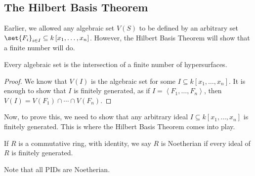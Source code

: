 \documentclass[10pt]{mypackage}
\begin{document}
\subsection{The Hilbert Basis Theorem}%
Earlier, we allowed any algebraic set $V(S)$ to be defined by an arbitrary set $\set{F_i}_{i\in I}\subseteq k\left[ x_1,\dots,x_n \right]$. However, the Hilbert Basis Theorem will show that a finite number will do.
\begin{theorem}
  Every algebraic set is the intersection of a finite number of hypersurfaces.
\end{theorem}
\begin{proof}
  We know that $V(I)$ is the algebraic set for some $I\subseteq k\left[ x_1,\dots,x_n \right]$. It is enough to show that $I$ is finitely generated, as if $I = \left\langle F_1,\dots,F_n \right\rangle$, then $V(I) = V\left( F_1 \right)\cap\cdots\cap V\left( F_n \right)$.
\end{proof}
Now, to prove this, we need to show that any arbitrary ideal $I\subseteq k\left[ x_1,\dots,x_n \right]$ is finitely generated. This is where the Hilbert Basis Theorem comes into play.
\begin{definition}
  If $R$ is a commutative ring, with identity, we say $R$ is Noetherian if every ideal of $R$ is finitely generated.
\end{definition}
Note that all PIDs are Noetherian.\newline
\end{document}

